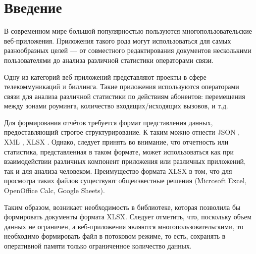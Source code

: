 \documentclass[14pt]{matmex-diploma-custom}
\begin{document}
\maketitle
\tableofcontents
\section*{Введение}
В современном мире большой популярностью пользуются многопользовательские веб-приложения. Приложения такого рода могут использоваться для самых разнообразных целей --- от совместного редактирования документов несколькими пользователями до анализа различной статистики операторами связи.

Одну из категорий веб-приложений представляют проекты в сфере телекоммуникаций и биллинга. Такие приложения используются операторами связи для анализа различной статистики по действиям абонентов: перемещения между зонами роуминга, количество входящих/исходящих вызовов, и т.д.

Для формирования отчётов требуется формат представления данных, предоставляющий строгое структурирование. К таким можно отнести JSON \cite{json}, XML \cite{xml}, XLSX \cite{xlsx}. Однако, следует принять во внимание, что отчетность или статистика, представленная в таком формате, может использоваться как при взаимодействии различных компонент приложения или различных приложений, так и для анализа человеком. Преимущество формата XLSX в том, что для просмотра таких файлов существуют общеизвестные решения (Microsoft Excel, OpenOffice Calc, Google Sheets). 

Таким образом, возникает необходимость в библиотеке, которая позволила бы формировать документы формата XLSX. Следует отметить, что, поскольку объем данных не ограничен, а веб-приложения являются многопользовательскими, то необходимо формировать файл в потоковом режиме, то есть, сохранять в оперативной памяти только ограниченное количество данных.
\end{document}
